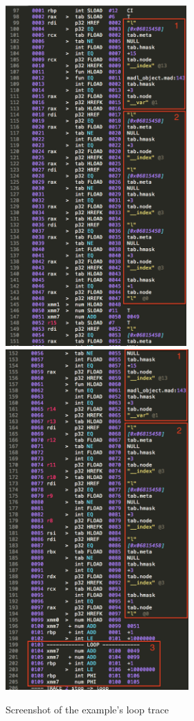 \begin{figure}[H]
    \centering
    \includegraphics[height=13cm]{./Images/trace-1a}
    \includegraphics[height=13cm]{./Images/trace-1b}
    \caption{Screenshot of the example's loop trace}
    \label{fig:MO-ex-dump}
\end{figure}

